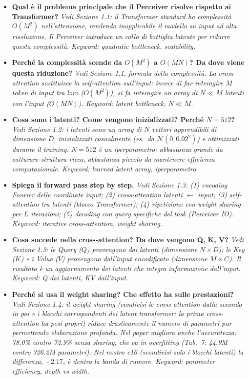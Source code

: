 \documentclass[
  11pt,
]{article}
\begin{document}
\begin{itemize}

  \item \textbf{Qual è il problema principale che il Perceiver risolve rispetto ai Transformer?}
  \textit{Vedi Sezione 1.1: il Transformer standard ha complessità $O(M^2)$ nell'attenzione, rendendo inapplicabile il modello su input ad alta risoluzione. Il Perceiver introduce un collo di bottiglia latente per ridurre questa complessità. Keyword: quadratic bottleneck, scalability.}

  \item \textbf{Perché la complessità scende da $O(M^2)$ a $O(MN)$? Da dove viene questa riduzione?}
  \textit{Vedi Sezione 1.1, formula della complessità. La cross-attention sostituisce la self-attention sull'input: invece di far interagire $M$ token di input tra loro ($O(M^2)$), si fa interagire un array di $N \ll M$ latenti con l'input ($O(MN)$). Keyword: latent bottleneck, $N \ll M$.}

  \item \textbf{Cosa sono i latenti? Come vengono inizializzati? Perché $N=512$?}
  \textit{Vedi Sezione 1.2: i latenti sono un array di $N$ vettori apprendibili di dimensione $D$, inizializzati casualmente (es.\ da $\mathcal{N}(0,0.02^2)$) e ottimizzati durante il training. $N=512$ è un iperparametro: abbastanza grande da catturare struttura ricca, abbastanza piccolo da mantenere efficienza computazionale. Keyword: learned latent array, iperparametro.}

  \item \textbf{Spiega il forward pass step by step.}
  \textit{Vedi Sezione 1.3: (1) encoding Fourier delle coordinate input; (2) cross-attention latenti $\leftarrow$ input; (3) self-attention tra latenti (blocco Transformer); (4) ripetizione con weight sharing per $L$ iterazioni; (5) decoding con query specifiche del task (Perceiver IO). Keyword: iterative cross-attention, weight sharing.}

  \item \textbf{Cosa succede nella cross-attention? Da dove vengono Q, K, V?}
  \textit{Vedi Sezione 1.3: le Query ($Q$) provengono dai latenti (dimensione $N \times D$); le Key ($K$) e i Value ($V$) provengono dall'input encodificato (dimensione $M \times C$). Il risultato è un aggiornamento dei latenti che integra informazione dall'input. Keyword: Q dai latenti, KV dall'input.}

  \item \textbf{Perché si usa il weight sharing? Che effetto ha sulle prestazioni?}
  \textit{Vedi Sezione 1.4: il weight sharing (condivisi le cross-attention dalla seconda in poi e i blocchi corrispondenti dei latent transformer; la prima cross-attention ha pesi propri) riduce drasticamente il numero di parametri pur permettendo elaborazione profonda. Nel paper migliora anche l'accuratezza: 78.0\% contro 72.9\% senza sharing, che va in overfitting (Tab.~7: 44.9M contro 326.2M parametri). Nel nostro e16 (scondivisi solo i blocchi latenti) la differenza, $-2.17$, è dentro la banda di rumore. Keyword: parameter efficiency, depth vs width.}


\end{itemize}
\end{document}
